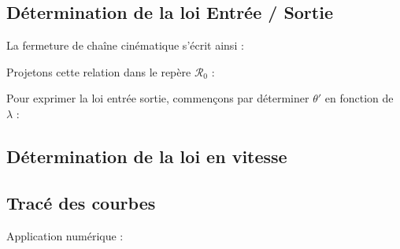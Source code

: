 \documentclass[10pt]{article}
\begin{document}
\subsection{Détermination de la loi Entrée / Sortie}

La fermeture de chaîne cinématique s'écrit ainsi : 


Projetons cette relation dans le repère $\mathcal{R}_{0}$ :


Pour exprimer la loi entrée sortie, commençons par déterminer $\theta'$ en fonction de $\lambda$ : 





\subsection{Détermination de la loi en vitesse}



\subsection{Tracé des courbes} 
Application numérique : 

%

\begin{thebibliography}{2}
\end{thebibliography}
\end{document}
